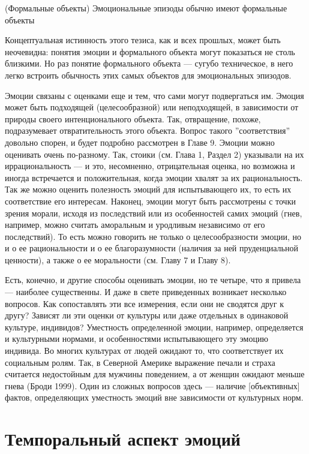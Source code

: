 \documentclass[11pt]{book}
\begin{document}
\smallskip

(Формальные объекты) Эмоциональные эпизоды обычно имеют формальные объекты

\smallskip

Концептуальная истинность этого тезиса, как и всех прошлых, может быть неочевидна: понятия эмоции и формального объекта могут показаться не столь близкими. Но раз понятие формального объекта --- сугубо техническое, в него легко встроить обычность этих самых объектов для эмоциональных эпизодов.

Эмоции связаны с оценками еще и тем, что сами могут подвергаться им. Эмоция может быть подходящей (целесообразной) или неподходящей, в зависимости от природы своего интенционального объекта. Так, отвращение, похоже, подразумевает отвратительность этого объекта. Вопрос такого ''соответствия'' довольно спорен, и будет подробно рассмотрен в Главе 9. Эмоции можно оценивать очень по-разному. Так, стоики (см. Глава 1, Раздел 2) указывали на их иррациональность --- и это, несомненно, отрицательная оценка, но возможна и иногда встречается и положительная, когда эмоции хвалят за их рациональность. Так же можно оценить полезность эмоций для испытывающего их, то есть их соответствие его интересам. Наконец, эмоции могут быть рассмотрены с точки зрения морали, исходя из последствий или из особенностей самих эмоций (гнев, например, можно считать аморальным и уродливым независимо от его последствий). То есть можно говорить не только о целесообразности эмоции, но и о ее рациональности и о ее благоразумности (наличия за ней пруденциальной ценности), а также о ее моральности (см. Главу 7 и Главу 8).

Есть, конечно, и другие способы оценивать эмоции, но те четыре, что я привела --- наиболее существенны. И даже в свете приведенных возникает несколько вопросов. Как сопоставлять эти все измерения, если они не сводятся друг к другу? Зависят ли эти оценки от культуры или даже отдельных в одинаковой культуре, индивидов? Уместность определенной эмоции, например, определяется и культурными нормами, и особенностями испытывающего эту эмоцию индивида. Во многих культурах от людей ожидают то, что соответствует их социальным ролям. Так, в Северной Америке выражение печали и страха считается недостойным для мужчины поведением, а от женщин ожидают меньше гнева (Броди 1999). Один из сложных вопросов здесь --- наличие [объективных] фактов, определяющих уместность эмоций вне зависимости от культурных норм.

\section{Темпоральный аспект эмоций}
\end{document}
